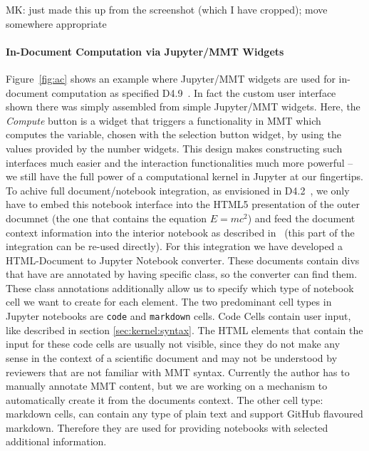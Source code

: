 

\begin{newpart}{MK: just made this up from the screenshot (which I have cropped); move somewhere appropriate}
  \paragraph{In-Document Computation via Jupyter/MMT Widgets}
  Figure~\ref{fig:ac} shows an example where Jupyter/MMT widgets are used for in-document computation as specified D4.9~\cite{ODK-D4.9}.
  In fact the custom user interface shown there was simply assembled from simple Jupyter/MMT widgets. Here, the \textit{Compute} button is a widget that triggers a functionality in MMT which computes the variable, chosen with the selection button widget, by using the values provided by the number widgets.
  This design makes constructing such interfaces much easier and the interaction functionalities much more powerful -- we still have the full power of a computational kernel in Jupyter at our fingertips. 
  To achive full document/notebook integration, as envisioned in D4.2~\cite{ODK-D4.2}, we only have to embed this notebook interface into the HTML5 presentation of the outer documnet (the one that contains the equation $E=mc^2$) and feed the document context information into the interior notebook as described in~\cite{ODK-D4.9} (this part of the integration can be re-used directly).
For this integration we have developed a HTML-Document to Jupyter Notebook converter. These documents contain divs that have are annotated by having specific class, so the converter can find them. These class annotations additionally allow us to specify which type of notebook cell we want to create for each element. The two predominant cell types in Jupyter notebooks are \texttt{code} and \texttt{markdown} cells. Code Cells contain user input, like described in section \ref{sec:kernel:syntax}. The HTML elements that contain the input for these code cells are usually not visible, since they do not make any sense in the context of a scientific document and may not be understood by reviewers that are not familiar with MMT syntax. Currently the author has to manually annotate MMT content, but we are working on a mechanism to automatically create it from the documents context. The other cell type: markdown cells, can contain any type of plain text and support GitHub flavoured markdown. Therefore they are used for providing notebooks with selected additional information.


\end{newpart}
